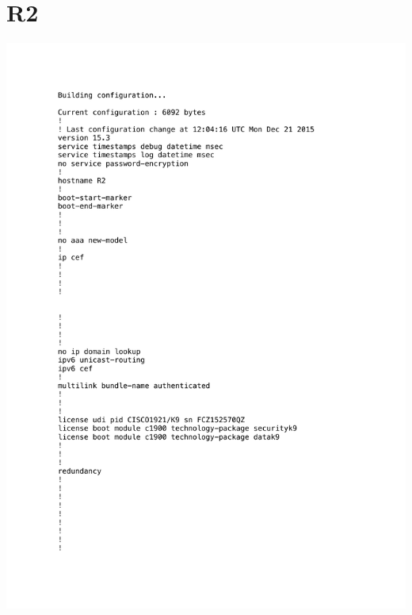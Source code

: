 \documentclass[11pt,a4paper]{scrreprt}
\begin{document}
\section{R2}
\vspace{-1cm}
\includegraphics[height=\dimexpr\textheight-4\baselineskip\relax,page=1]{../config_files/R2.pdf}

\end{document}
